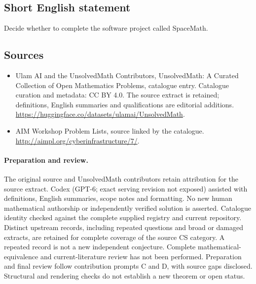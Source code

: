 \documentclass[11pt]{article}
\begin{document}
\subsection{Short English statement}
Decide whether to complete the software project called SpaceMath.
\subsection{Sources}
\begin{itemize}
\item[\hypertarget{source:statement:1}{S1}] Ulam AI and the UnsolvedMath Contributors, UnsolvedMath: A Curated Collection of Open Mathematics Problems, catalogue entry. Catalogue curation and metadata: CC BY 4.0. The source extract is retained; definitions, English summaries and qualifications are editorial additions.
\url{https://huggingface.co/datasets/ulamai/UnsolvedMath}.
\item[\hypertarget{source:statement:2}{S2}] AIM Workshop Problem Lists, source linked by the catalogue.
\url{http://aimpl.org/cyberinfrastructure/7/}.
\end{itemize}
\paragraph{Preparation and review.}
The original source and UnsolvedMath contributors retain attribution for the source extract. Codex (GPT-6; exact serving revision not exposed) assisted with definitions, English summaries, scope notes and formatting. No new human mathematical authorship or independently verified solution is asserted. Catalogue identity checked against the complete supplied registry and current repository. Distinct upstream records, including repeated questions and broad or damaged extracts, are retained for complete coverage of the source CS category. A repeated record is not a new independent conjecture. Complete mathematical-equivalence and current-literature review has not been performed. Preparation and final review follow contribution prompts C and D, with source gaps disclosed. Structural and rendering checks do not establish a new theorem or open status.
\label{end:statement}
\end{document}
